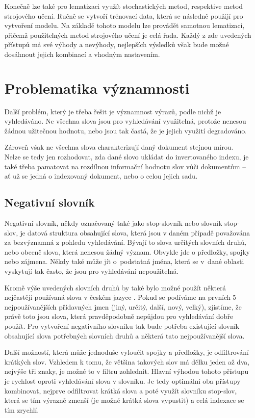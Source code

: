 \documentclass[FM,DP]{tulthesis}
\begin{document}
Konečně lze také pro lematizaci využít stochastických metod, respektive metod strojového
učení. Ručně se vytvoří trénovací data, která se následně použijí pro vytvoření modelu.
Na základě tohoto modelu lze provádět samotnou lematizaci, přičemž použitelných metod 
strojového učení je celá řada. Každý z zde uvedených přístupů má své výhody a nevýhody, 
nejlepších výsledků však bude možné dosáhnout jejich kombinací a vhodným nastavením.

\section{Problematika významnosti}

Další problém, který je třeba řešit je významnost výrazů, podle nichž je vyhledáváno.
Ne všechna slova jsou pro vyhledávání využitelná, protože nenesou žádnou užitečnou 
hodnotu, nebo jsou tak častá, že je jejich využití degradováno. 

Zároveň však ne všechna slova charakterizují daný dokument stejnou mírou. Nelze se tedy 
jen rozhodovat, zda dané slovo ukládat do invertovaného indexu, je také třeba pamatovat
na rozdílnou informační hodnotu slov vůči dokumentům -- ať už se jedná o indexovaný
dokument, nebo o celou jejich sadu.

\subsection{Negativní slovník}

Negativní slovník, někdy označovaný také jako stop-slovník nebo slovník stop-slov, 
je datová struktura obsahující slova, která jsou v daném případě považována za bezvýznamná
z pohledu vyhledávání. Bývají to slova určitých slovních druhů, nebo obecně slova, která 
nenesou žádný význam. Obvykle jde o předložky, spojky nebo zájmena. Někdy také může jít 
o~podstatná jména, která se v~dané oblasti vyskytují tak často, že jsou pro vyhledávání nepoužitelná.

Kromě výše uvedených slovních druhů by také bylo možné použít některá nejčastěji používaná
slova v českém jazyce \cite{nejpouzivanejsi-slova} . Pokud se podíváme na prvních 5 nejpoužívanějších 
přídavných jmen (jiný, určitý, další, nový, velký), zjistíme, že právě toto jsou slova, 
která pravděpodobně nepůjdou pro vyhledávání dobře použít. Pro vytvoření negativního slovníku 
tak bude potřeba existující slovník obsahující slova potřebných slovních druhů a některá tato 
nejpoužívanější slova.

Další možností, která může jednoduše vyloučit spojky a předložky, je odfiltrování krátkých
slov. Vzhledem k tomu, že většina takových slov má dělku jeden až dva, nejvýše tři znaky, 
je možné to v filtru zohlednit. Hlavní výhodou tohoto přístupu je rychlost oproti vyhledávání
slova v slovníku. Je tedy optimální oba přístupy kombinovat, nejprve odfiltrovat krátká slova
a poté využít slovníku stop-slov, která se tím výrazně zmenší (je možné krátká slova vypustit)
a celá indexace se tím zrychlí.
\end{document}
